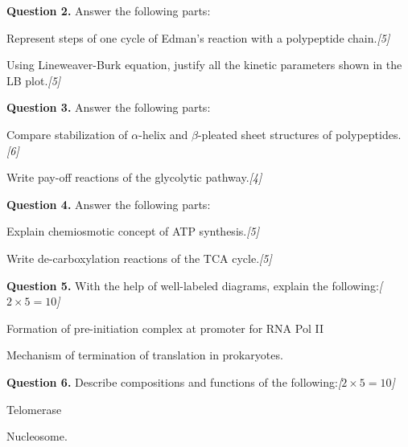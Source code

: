 \documentclass[11pt,a4paper]{article}
\newcommand{\pts}[1]{\hfill   \textit{[#1]}}
\begin{document}
\pagebreak

\medskip


\noindent   \textbf{Question 2.} Answer the following parts:

\begin{parts}
  \item Represent steps of one cycle of Edman's reaction with a polypeptide chain.\pts{5}
  \item Using Lineweaver-Burk equation, justify all the kinetic parameters shown in the LB plot.\pts{5}
\end{parts}

\medskip


\noindent   \textbf{Question 3.} Answer the following parts:

\begin{parts}
  \item Compare stabilization of $\alpha$-helix and $\beta$-pleated sheet structures of polypeptides.\pts{6}
  \item Write pay-off reactions of the glycolytic pathway.\pts{4}
\end{parts}

\medskip


\noindent   \textbf{Question 4.} Answer the following parts:

\begin{parts}
  \item Explain chemiosmotic concept of ATP synthesis.\pts{5}
  \item Write de-carboxylation reactions of the TCA cycle.\pts{5}
\end{parts}

\medskip


\noindent   \textbf{Question 5.} With the help of well-labeled diagrams, explain the following:\pts{$2  \times 5 = 10$}

\begin{parts}
  \item Formation of pre-initiation complex at promoter for RNA Pol II
  \item Mechanism of termination of translation in prokaryotes.
\end{parts}

\medskip


\noindent   \textbf{Question 6.} Describe compositions and functions of the following:\pts{$2  \times 5 = 10$}

\begin{parts}
  \item Telomerase
  \item Nucleosome.
\end{parts}
\end{document}
